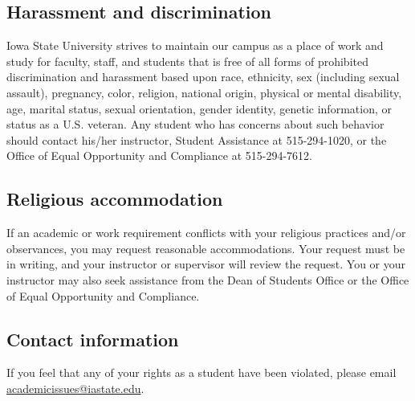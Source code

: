 \subsection{Harassment and discrimination}

Iowa State University strives to maintain our campus as a place of
work and study for faculty, staff, and students that is free of all
forms of prohibited discrimination and harassment based upon race,
ethnicity, sex (including sexual assault), pregnancy, color, religion,
national origin, physical or mental disability, age, marital status,
sexual orientation, gender identity, genetic information, or status as
a U.S. veteran. Any student who has concerns about such behavior
should contact his/her instructor, Student Assistance at 515-294-1020,
or the Office of Equal Opportunity and Compliance at 515-294-7612.

\subsection{Religious accommodation}

If an academic or work requirement conflicts with your religious
practices and/or observances, you may request reasonable
accommodations. Your request must be in writing, and your instructor
or supervisor will review the request.  You or your instructor may
also seek assistance from the Dean of Students Office or the Office of
Equal Opportunity and Compliance.

\subsection{Contact information}

If you feel that any of your rights as a student have been violated,
please email \url{academicissues@iastate.edu}.

\newpage





